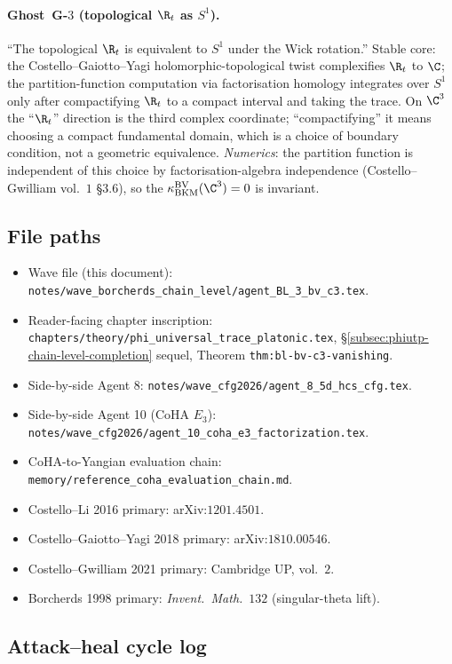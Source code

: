 \paragraph{Ghost~G-$3$ (topological $\R_t$ as $S^1$).}
``The topological $\R_t$ is equivalent to $S^1$ under the Wick
rotation.'' Stable core: the Costello--Gaiotto--Yagi
holomorphic-topological twist complexifies $\R_t$ to $\C$; the
partition-function computation via factorisation homology integrates
over $S^1$ only after compactifying $\R_t$ to a compact interval
and taking the trace. On $\C^3$ the ``$\R_t$'' direction is the
third complex coordinate; ``compactifying'' it means choosing a
compact fundamental domain, which is a choice of boundary condition,
not a geometric equivalence. \emph{Numerics}: the partition
function is independent of this choice by factorisation-algebra
independence (Costello--Gwilliam vol.\ $1$ \S$3$.$6$), so the
$\kBKM^{\mathrm{BV}}(\C^3) = 0$ is invariant.

\subsection*{File paths}

\begin{itemize}
\item Wave file (this document): \texttt{notes/wave\_borcherds\_chain\_level/agent\_BL\_3\_bv\_c3.tex}.
\item Reader-facing chapter inscription: \texttt{chapters/theory/phi\_universal\_trace\_platonic.tex},
\S\ref{subsec:phiutp-chain-level-completion} sequel, Theorem
\texttt{thm:bl-bv-c3-vanishing}.
\item Side-by-side Agent 8: \texttt{notes/wave\_cfg2026/agent\_8\_5d\_hcs\_cfg.tex}.
\item Side-by-side Agent 10 (CoHA $E_3$): \texttt{notes/wave\_cfg2026/agent\_10\_coha\_e3\_factorization.tex}.
\item CoHA-to-Yangian evaluation chain: \texttt{memory/reference\_coha\_evaluation\_chain.md}.
\item Costello--Li 2016 primary: arXiv:$1201.4501$.
\item Costello--Gaiotto--Yagi 2018 primary: arXiv:$1810.00546$.
\item Costello--Gwilliam 2021 primary: Cambridge UP, vol.\ $2$.
\item Borcherds 1998 primary: \textit{Invent.\ Math.}~$132$ (singular-theta lift).
\end{itemize}

\subsection*{Attack--heal cycle log}

